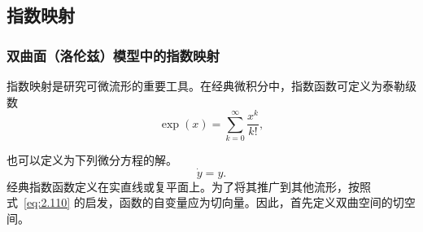 \subsection{指数映射}
\subsubsection{双曲面（洛伦兹）模型中的指数映射}
指数映射是研究可微流形的重要工具。在经典微积分中，指数函数可定义为泰勒级数
\[
  \exp(x)=\sum_{k=0}^{\infty}\frac{x^k}{k!},
\]
\begin{figure}[htbp]
  \centering
  
\end{figure}
也可以定义为下列微分方程的解。
\begin{equation*}
  \dot y=y.
  \tag{2.110}\label{eq:2.110}
\end{equation*}
经典指数函数定义在实直线或复平面上。为了将其推广到其他流形，按照式~\eqref{eq:2.110} 的启发，函数的自变量应为切向量。因此，首先定义双曲空间的切空间。


